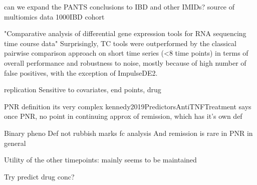\begin{outline}
\1 can we expand the PANTS conclusions to IBD and other IMIDs?
\1 source of multiomics data 1000IBD cohort \autocite{imhann20191000IBDProjectMultiomics}

"Comparative analysis of differential gene expression tools for RNA sequencing time course data"
Surprisingly, TC tools were outperformed by the classical pairwise comparison approach on short time series (<8 time points) in terms of overall performance and robustness to noise, mostly because of high number of false positives, with the exception of ImpulseDE2.

replication
    Sensitive to covariates, end points, drug

PNR definition
    its very complex
    kennedy2019PredictorsAntiTNFTreatment says once PNR, no point in continuing
        approx of remission, which has it's own def

    Binary pheno Def not rubbish
        marks fc analysis
        And remission is rare in PNR in general

Utility of the other timepoints:
    mainly seems to be maintained

Try predict drug conc?


\end{outline}
